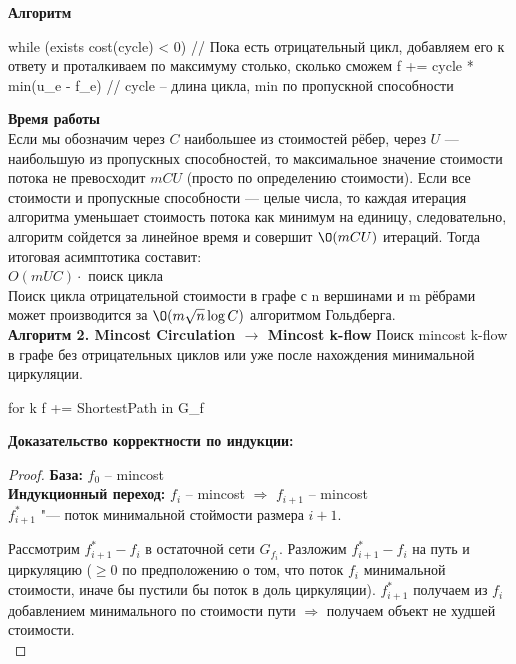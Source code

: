 {\bfseries Алгоритм}\\

\begin{cppcode}
	while (exists cost(cycle) < 0) // Пока есть отрицательный цикл, добавляем его к ответу и проталкиваем по максимуму столько, сколько сможем 
		f += cycle * min(u_e - f_e) // cycle -- длина цикла, min по пропускной способности
\end{cppcode}

{\bfseries Время работы}\\
Если мы обозначим через $C$ наибольшее из стоимостей рёбер, через $U$ — наибольшую из пропускных способностей, то максимальное значение стоимости потока не превосходит $mCU$ (просто по определению стоимости).
Если все стоимости и пропускные способности — целые числа, то каждая итерация алгоритма уменьшает стоимость потока как минимум на единицу, следовательно, алгоритм сойдется за линейное время и совершит $\O(mCU)$
итераций. Тогда итоговая асимптотика составит:\\
$O(mUC)\cdot$ поиск цикла\\
Поиск цикла отрицательной стоимости в графе с n вершинами и m рёбрами может производится за $\O(m\sqrt n \log C)$ алгоритмом Гольдберга.\\

{\bfseries Алгоритм 2. Mincost Circulation $\to$ Mincost k-flow}
Поиск mincost k-flow в графе без отрицательных циклов или уже после нахождения
минимальной циркуляции.

\begin{cppcode}
	for k
		f += ShortestPath in G_f	
\end{cppcode}

{\bfseries Доказательство корректности по индукции:}\\
\begin{proof}                                                            
{\bfseries База:} $f_0$ -- mincost\\
{\bfseries Индукционный переход:} $f_i$ -- mincost $\Rightarrow$ $f_{i+1}$ -- mincost\\

$f^*_{i + 1}$ "--- поток минимальной стоймости размера $i + 1$.


Рассмотрим $f^*_{i+1} - f_i$ в остаточной сети $G_{f_i}$. Разложим $f^*_{i + 1} - f_i$ на путь и циркуляцию ($\ge 0$ по предположению о
том, что поток $f_i$ минимальной стоимости, иначе бы пустили бы поток в доль циркуляции). $f^*_{i+1}$ получаем из $f_{i}$ добавлением минимального
по стоимости пути $\Rightarrow$ получаем объект не худшей стоимости.\\

\end{proof}

